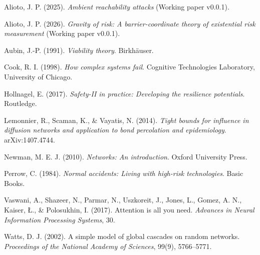 \documentclass[11pt]{article}
\begin{document}
\begin{description}[leftmargin=1.5em, labelindent=0em, itemsep=0.4em]
\item Alioto, J. P. (2025). \emph{Ambient reachability attacks} (Working paper v0.0.1).

\item Alioto, J. P. (2026). \emph{Gravity of risk: A barrier-coordinate theory of existential risk measurement} (Working paper v0.0.1).

\item Aubin, J.-P. (1991). \emph{Viability theory}. Birkh\"auser.

\item Cook, R. I. (1998). \emph{How complex systems fail}. Cognitive Technologies Laboratory, University of Chicago.

\item Hollnagel, E. (2017). \emph{Safety-II in practice: Developing the resilience potentials}. Routledge.

\item Lemonnier, R., Scaman, K., \& Vayatis, N. (2014). \emph{Tight bounds for influence in diffusion networks and application to bond percolation and epidemiology}. arXiv:1407.4744.

\item Newman, M. E. J. (2010). \emph{Networks: An introduction}. Oxford University Press.

\item Perrow, C. (1984). \emph{Normal accidents: Living with high-risk technologies}. Basic Books.

\item Vaswani, A., Shazeer, N., Parmar, N., Uszkoreit, J., Jones, L., Gomez, A. N., Kaiser, \L., \& Polosukhin, I. (2017). Attention is all you need. \emph{Advances in Neural Information Processing Systems}, 30.

\item Watts, D. J. (2002). A simple model of global cascades on random networks. \emph{Proceedings of the National Academy of Sciences}, 99(9), 5766--5771.
\end{description}
\end{document}
